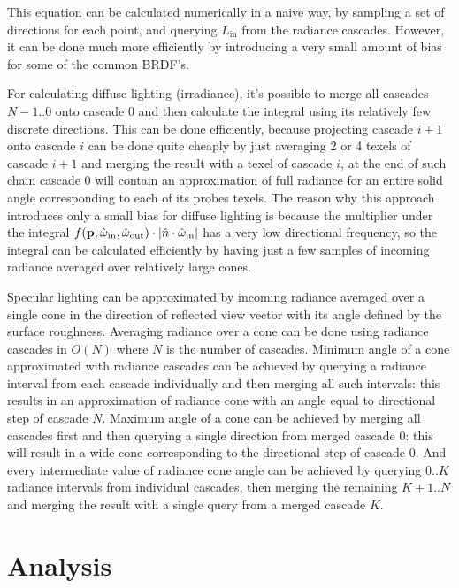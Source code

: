 \documentclass{jcgt}
\begin{document}
This equation can be calculated numerically in a naive way, by sampling a set of directions for each point, and querying $L_{\mathrm{in}}$ from the radiance cascades. However, it can be done much more efficiently by introducing a very small amount of bias for some of the common BRDF's.

For calculating diffuse lighting (irradiance), it's possible to merge all cascades $N-1..0$ onto cascade 0 and then calculate the integral using its relatively few discrete directions. This can be done efficiently, because projecting cascade $i+1$ onto cascade $i$ can be done quite cheaply by just averaging 2 or 4 texels of cascade $i+1$ and merging the result with a texel of cascade $i$, at the end of such chain cascade 0 will contain an approximation of full radiance for an entire solid angle corresponding to each of its probes texels. The reason why this approach introduces only a small bias for diffuse lighting is because the multiplier under the integral $ f(\textbf p, \hat \omega_\mathrm{in}, \hat{\omega}_\mathrm{out}) \cdot |\hat{n} \cdot \hat{\omega}_\mathrm{in} |$ has a very low directional frequency, so the integral can be calculated efficiently by having just a few samples of incoming radiance averaged over relatively large cones.

Specular lighting can be approximated by incoming radiance averaged over a single cone in the direction of reflected view vector with its angle defined by the surface roughness. Averaging radiance over a cone can be done using radiance cascades in $O(N)$ where $N$ is the number of cascades. Minimum angle of a cone approximated with radiance cascades can be achieved by querying a radiance interval from each cascade individually and then merging all such intervals: this results in an approximation of radiance cone with an angle equal to directional step of cascade $N$.  Maximum angle of a cone can be achieved by merging all cascades first and then querying a single direction from merged cascade 0: this will result in a wide cone corresponding to the directional step of cascade 0. And every intermediate value of radiance cone angle can be achieved by querying $0..K$ radiance intervals from individual cascades, then merging the remaining $K+1..N$ and merging the result with a single query from a merged cascade $K$.

\section{Analysis}
\end{document}
